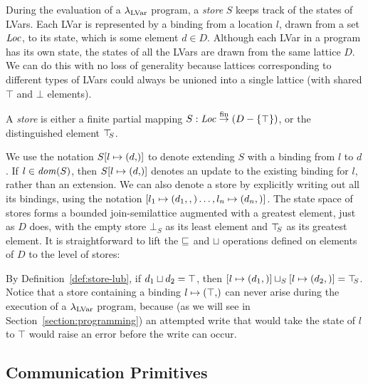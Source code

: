 During the evaluation of a $\lambda_{\textrm{LVar}}$ program, a \emph{store} $S$
keeps track of the states of LVars.  Each LVar is represented by a
binding from a location $l$, drawn from a set $\mathit{Loc}$, to its state,
which is some element $d \in D$.  Although each LVar in a program has
its own state, the states of all the LVars are drawn from the same
lattice $D$.  We can do this with no loss of generality because
lattices corresponding to different types of LVars could always be
unioned into a single lattice (with shared $\top$ and $\bot$
elements).

\begin{definition}\label{def:store}
A \emph{store} is either a finite partial mapping $S : \mathit{Loc} \stackrel{\textrm{fin}}{\rightarrow} (D-\lbrace \top \rbrace)$, or the distinguished element $\top\hspace{-0.85mm}_{S}$.
\end{definition}

\noindent We use the notation $\extS{S}{l}{d}$ to denote extending $S$
with a binding from $l$ to $d$.  If $l \in \mathit{dom}(S)$, then
$\extS{S}{l}{d}$ denotes an update to the existing binding for $l$,
rather than an extension.  We can also denote a store by explicitly
writing out all its bindings, using the notation
$\left[ l_1 \mapsto (d_1, ,) \dots, l_n \mapsto (d_n, \right)]$.
%
The state space of stores forms a bounded join-semilattice
augmented with a greatest element, just as
$D$ does, with the empty store $\bot_S$ as its least element and $\top\hspace{-0.85mm}_{S}$ 
as its greatest element.
It is straightforward to lift the $\sqsubseteq$ and $\sqcup$ operations defined
on elements of $D$ to the level of stores:

\DefLeqStore

\DefLubStore

\noindent By Definition~\ref{def:store-lub}, if $d_1 \sqcup d_2 =
\top$, then
$\left[ l \mapsto (d_1, \right)] \sqcup_{S} \left[ l \mapsto (d_2, \right)]
= \top\hspace{-0.85mm}_{S}$.  
Notice that a store containing a binding $\storebinding{l}{\top}$ can never arise
during the execution of a $\lambda_{\textrm{LVar}}$ program, because (as we will
see in Section~\ref{section:programming}) an attempted write that would take
the state of $l$ to $\top$ would raise an error before the write can occur.

\subsection{Communication Primitives}\label{subsection:putget}

